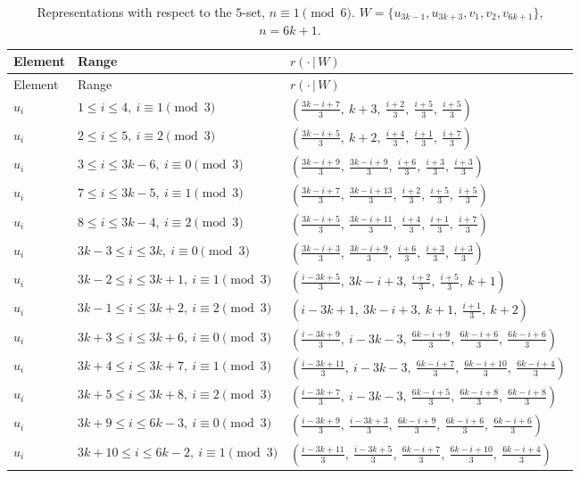 \begin{longtable}{lll}
\caption{Representations with respect to the $5$-set, $n\equiv 1 \pmod 6$. $W=\{u_{3k-1}, u_{3k+3}, v_{1}, v_{2}, v_{6k+1}\}$, $n=6k+1$.}\label{tab:W51}\\
\hline Element & Range & $r(\cdot\,|\,W)$ \\ \hline
\endfirsthead
\hline Element & Range & $r(\cdot\,|\,W)$ \\ \hline
\endhead
$u_i$ & $1 \le i \le 4,\ i \equiv 1 \pmod{3}$ & $(\frac{3k-i+7}{3},\ k+3,\ \frac{i+2}{3},\ \frac{i+5}{3},\ \frac{i+5}{3})$ \\
$u_i$ & $2 \le i \le 5,\ i \equiv 2 \pmod{3}$ & $(\frac{3k-i+5}{3},\ k+2,\ \frac{i+4}{3},\ \frac{i+1}{3},\ \frac{i+7}{3})$ \\
$u_i$ & $3 \le i \le 3k-6,\ i \equiv 0 \pmod{3}$ & $(\frac{3k-i+9}{3},\ \frac{3k-i+9}{3},\ \frac{i+6}{3},\ \frac{i+3}{3},\ \frac{i+3}{3})$ \\
$u_i$ & $7 \le i \le 3k-5,\ i \equiv 1 \pmod{3}$ & $(\frac{3k-i+7}{3},\ \frac{3k-i+13}{3},\ \frac{i+2}{3},\ \frac{i+5}{3},\ \frac{i+5}{3})$ \\
$u_i$ & $8 \le i \le 3k-4,\ i \equiv 2 \pmod{3}$ & $(\frac{3k-i+5}{3},\ \frac{3k-i+11}{3},\ \frac{i+4}{3},\ \frac{i+1}{3},\ \frac{i+7}{3})$ \\
$u_i$ & $3k-3 \le i \le 3k,\ i \equiv 0 \pmod{3}$ & $(\frac{3k-i+3}{3},\ \frac{3k-i+9}{3},\ \frac{i+6}{3},\ \frac{i+3}{3},\ \frac{i+3}{3})$ \\
$u_i$ & $3k-2 \le i \le 3k+1,\ i \equiv 1 \pmod{3}$ & $(\frac{i-3k+5}{3},\ 3k-i+3,\ \frac{i+2}{3},\ \frac{i+5}{3},\ k+1)$ \\
$u_i$ & $3k-1 \le i \le 3k+2,\ i \equiv 2 \pmod{3}$ & $(i-3k+1,\ 3k-i+3,\ k+1,\ \frac{i+1}{3},\ k+2)$ \\
$u_i$ & $3k+3 \le i \le 3k+6,\ i \equiv 0 \pmod{3}$ & $(\frac{i-3k+9}{3},\ i-3k-3,\ \frac{6k-i+9}{3},\ \frac{6k-i+6}{3},\ \frac{6k-i+6}{3})$ \\
$u_i$ & $3k+4 \le i \le 3k+7,\ i \equiv 1 \pmod{3}$ & $(\frac{i-3k+11}{3},\ i-3k-3,\ \frac{6k-i+7}{3},\ \frac{6k-i+10}{3},\ \frac{6k-i+4}{3})$ \\
$u_i$ & $3k+5 \le i \le 3k+8,\ i \equiv 2 \pmod{3}$ & $(\frac{i-3k+7}{3},\ i-3k-3,\ \frac{6k-i+5}{3},\ \frac{6k-i+8}{3},\ \frac{6k-i+8}{3})$ \\
$u_i$ & $3k+9 \le i \le 6k-3,\ i \equiv 0 \pmod{3}$ & $(\frac{i-3k+9}{3},\ \frac{i-3k+3}{3},\ \frac{6k-i+9}{3},\ \frac{6k-i+6}{3},\ \frac{6k-i+6}{3})$ \\
$u_i$ & $3k+10 \le i \le 6k-2,\ i \equiv 1 \pmod{3}$ & $(\frac{i-3k+11}{3},\ \frac{i-3k+5}{3},\ \frac{6k-i+7}{3},\ \frac{6k-i+10}{3},\ \frac{6k-i+4}{3})$ \\

\end{longtable}
